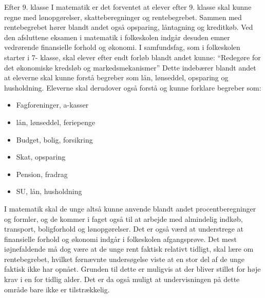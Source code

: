 Efter 9. klasse
I matematik er det forventet at elever efter 9. klasse skal kunne regne med lønopgørelser, skatteberegninger og rentebegrebet.  Sammen med rentebegrebet hører blandt andet også opsparing, låntagning og kreditkøb.
Ved den afsluttene eksamen i matematik i folkeskolen indgår desuden emner vedrørende finansielle forhold og økonomi.
I samfundsfag, som i folkeskolen starter i 7- klasse, skal elever efter endt forløb blandt andet kunne: “Redegøre for det økonomiske kredsløb og markedsmekanismer” \cite{FallesMalSamfundsfag}
Dette indebærer blandt andet at eleverne skal kunne forstå begreber som lån, lønseddel, opsparing og husholdning.
Eleverne skal derudover også forstå og kunne forklare begreber som: 

\noindent \begin{itemize}
\item{Fagforeninger, a-kasser}
\item{lån, lønseddel, feriepenge}
\item{Budget, bolig, forsikring}
\item{Skat, opsparing}
\item{Pension, fradrag}
\item{SU, lån, husholdning}
\cite{FallesMalMatematik}\\
\end{itemize}

I matematik skal de unge altså kunne anvende blandt andet procentberegninger og formler, og de kommer i faget også til at arbejde med almindelig indkøb, transport, boligforhold og lønopgørelser. Det er også værd at understrege at finansielle forhold og økonomi indgår i folkeskolen afgangsprøve. Det mest iøjnefaldende må dog være at de unge rent faktisk relativt tidligt, skal lære om rentebegrebet, hvilket førnævnte undersøgelse viste at en stor del af de unge faktisk ikke har opnået. Grunden til dette er muligvis at der bliver stillet for høje krav i en for tidlig alder. Det er da også muligt at undervisningen på dette område bare ikke er tilstrækkelig.\\

